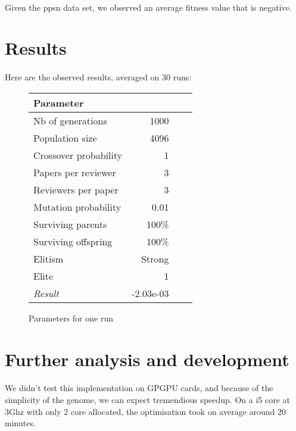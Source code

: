 \documentclass{article}
\begin{document}
    \paragraph{} %
    \label{par:}
      Given the ppsn data set, we observed an average fitness value that is
      negative.
    
   
   \section{Results} %
   \label{sec:Result}
   \paragraph{} %
   
     \label{par:}
       Here are the observed results, averaged on 30 runs:
    
    \begin{figure}
    \begin{small} 
    \begin{tabular}{lrrr}
      Parameter &  \\
      \hline
      Nb of generations & 1000 \\
      Population size & 4096  \\
      Crossover probability & 1 \\
      Papers per reviewer & 3 \\
      Reviewers per paper & 3 \\
      Mutation probability & 0.01\\
      Surviving parents & 100\%  \\
      Surviving offspring & 100\% \\
      Elitism & Strong \\
      Elite & 1 \\ \hline
      \emph{Result} & -2.03e-03 \\
      \hline 
      \end{tabular}
      \caption{Parameters for one run}  
      \end{small}
      \end{figure}

   \section{Further analysis and development} %
   \label{sec:section name}
   \paragraph{} %
   \label{par:}
   
     We didn't test this implementation on GPGPU cards, and because of the
     simplicity of the genome, we can expect tremendious speedup. On a i5 core at
     3Ghz with only 2 core allocated, the optimisation took on average around 20 minutes. 
  
\end{document}
